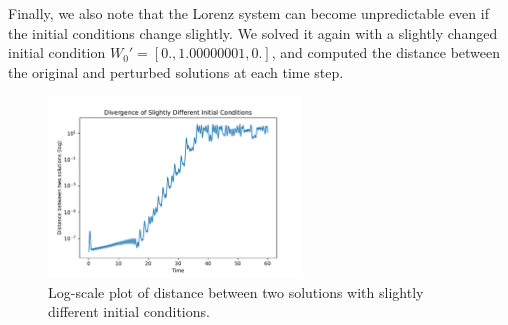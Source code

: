\documentclass{article}
\begin{document}
Finally, we also note that the Lorenz system can become unpredictable even if the initial conditions change slightly. 
We solved it again with a slightly changed initial condition \( W_0' = [0., 1.00000001, 0.] \), and computed the distance between the original and perturbed solutions at each time step.

\begin{figure}[H]
    \centering
    \includegraphics[width=0.6\textwidth]{question2fig3.pdf}
    \caption{Log-scale plot of distance between two solutions with slightly different initial conditions.}
    \label{fig:q2_divergence}
\end{figure}
\end{document}
